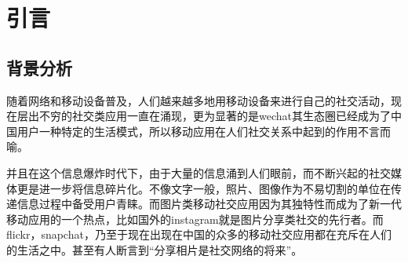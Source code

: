 
\chapter{引言}
\section{背景分析}
随着网络和移动设备普及，人们越来越多地用移动设备来进行自己的社交活动，现在层出不穷的社交类应用一直在涌现，更为显著的是wechat其生态圈已经成为了中国用户一种特定的生活模式，所以移动应用在人们社交关系中起到的作用不言而喻。

并且在这个信息爆炸时代下，由于大量的信息涌到人们眼前，而不断兴起的社交媒体更是进一步将信息碎片化。不像文字一般，照片、图像作为不易切割的单位在传递信息过程中备受用户青睐。而图片类移动社交应用因为其独特性而成为了新一代移动应用的一个热点，比如国外的instagram就是图片分享类社交的先行者。而flickr，snapchat，乃至于现在出现在中国的众多的移动社交应用都在充斥在人们的生活之中。甚至有人断言到“分享相片是社交网络的将来”。






